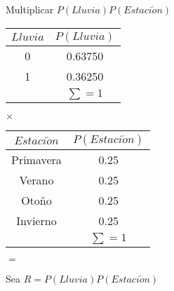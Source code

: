 \begin{example}{Multiplicar $P(Lluvia)P(Estaci\acute{o}n)$}
\begin{center}
\begin{tabular}{c|c}
 $Lluvia$ & $P(Lluvia)$ \\ \toprule
 \rowcolor{gray!10}0 & 0.63750 \\
 1 & 0.36250 \\
 \multicolumn{1}{c}{}  & $\sum=1$
\end{tabular}
$\times$
\begin{tabular}{c|c}
 $Estaci\acute{o}n$ & $P(Estaci\acute{o}n)$ \\ \toprule
 \rowcolor{\colTableRow}Primavera & 0.25 \\
 \rowcolor{\colTableRowOne}Verano & 0.25 \\
 \rowcolor{\colTableRowTwo}Otoño & 0.25 \\
 \rowcolor{\colTableRowThree}Invierno & 0.25 \\
 \multicolumn{1}{c}{}  & $\sum=1$
\end{tabular}$=$

Sea $R = P(Lluvia)P(Estaci\acute{o}n)$


\end{center}
\end{example}
